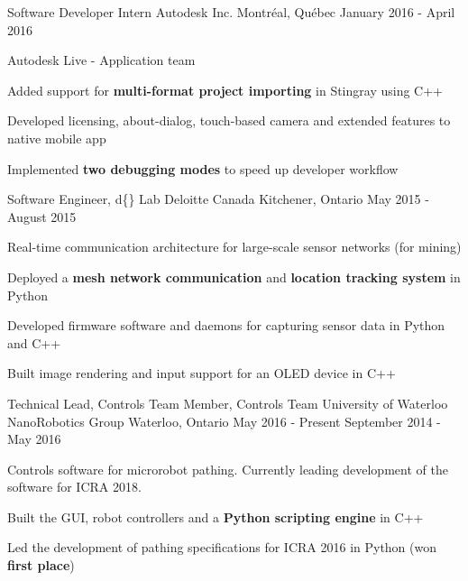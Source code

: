 \begin{cventries}

\cventry
{Software Developer Intern}
{Autodesk Inc.}
{Montréal, Québec}
{January 2016 - April 2016}
{ %
Autodesk Live - Application team
\begin{cvitems}
\item[]
\item {Added support for \textbf{multi-format project importing} in Stingray using C++}
\item {Developed licensing, about-dialog, touch-based camera and extended features to native mobile app}
\item {Implemented \textbf{two debugging modes} to speed up developer workflow}
\end{cvitems}
}


\cventry
{Software Engineer, d\{\} Lab}
{Deloitte Canada} %
{Kitchener, Ontario} %
{May 2015 - August 2015} %
{
Real-time communication architecture for large-scale sensor networks (for mining)
\begin{cvitems}
\item[]
\item {Deployed a \textbf{mesh network communication} and \textbf{location tracking system} in Python}
\item {Developed firmware software and daemons for capturing sensor data in Python and C++}
\item {Built image rendering and input support for an OLED device in C++}
\end{cvitems}
}


\cventry
{Technical Lead, Controls Team \newline {\vspace{-.75mm}}
Member, Controls Team}
{University of Waterloo NanoRobotics Group}
{Waterloo, Ontario}
{May 2016 - Present \newline {\vspace{-1mm}}
September 2014 - May 2016} %
{ %
Controls software for microrobot pathing. Currently leading development of the software for ICRA 2018.
\begin{cvitems}
\item[]
\item {Built the GUI, robot controllers and a \textbf{Python scripting engine} in C++}
\item {Led the development of pathing specifications for ICRA 2016 in Python (won \textbf{first place})}
\end{cvitems}
}

\end{cventries}
